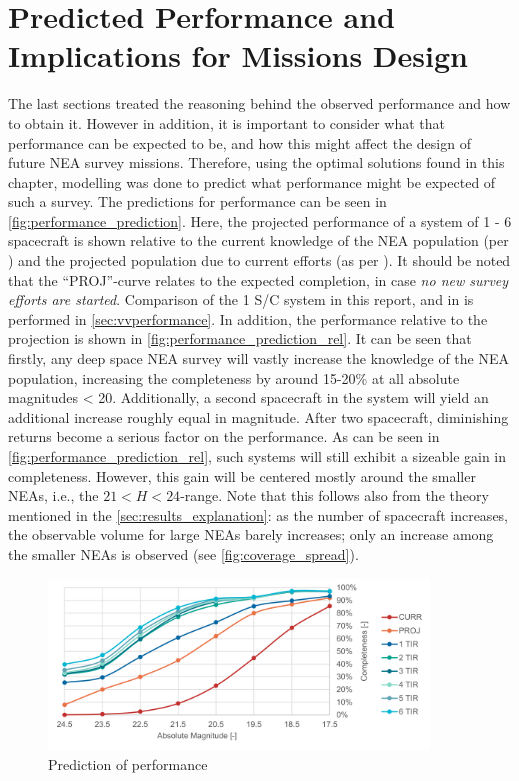 \section{Predicted Performance and Implications for Missions Design}
\label{sec:results_performance}
The last sections treated the reasoning behind the observed performance and how to obtain it. However in addition, it is important to consider what that performance can be expected to be, and how this might affect the design of future NEA survey missions. Therefore, using the optimal solutions found in this chapter, modelling was done to predict what performance might be expected of such a survey. The predictions for performance can be seen in \autoref{fig:performance_prediction}. Here, the projected performance of a system of 1 - 6 spacecraft is shown relative to the current knowledge of the NEA population (per \cite{HarrisPopulation}) and the projected population due to current efforts (as per \cite{2017NEOSDT}). It should be noted that the ``PROJ''-curve relates to the expected completion, in case \textit{no new survey efforts are started}. Comparison of the 1 S/C system in this report, and in \cite{2017NEOSDT} is performed in \autoref{sec:vvperformance}. In addition, the performance relative to the projection is shown in \autoref{fig:performance_prediction_rel}. It can be seen that firstly, any deep space NEA survey will vastly increase the knowledge of the NEA population, increasing the completeness by around 15-20\% at all absolute magnitudes < 20. Additionally, a second spacecraft in the system will yield an additional increase roughly equal in magnitude. After two spacecraft, diminishing returns become a serious factor on the performance. As can be seen in \autoref{fig:performance_prediction_rel}, such systems will still exhibit a sizeable gain in completeness. However, this gain will be centered mostly around the smaller NEAs, i.e., the $21 < H < 24$-range. Note that this follows also from the theory mentioned in the \autoref{sec:results_explanation}: as the number of spacecraft increases, the observable volume for large NEAs barely increases; only an increase among the smaller NEAs is observed (see \autoref{fig:coverage_spread}).\\


\begin{figure}[htbp]
 \centering
 \includegraphics[width=0.9\textwidth]{img/performance_prediction.pdf}
 \caption{Prediction of performance}
 \label{fig:performance_prediction}
\end{figure}


